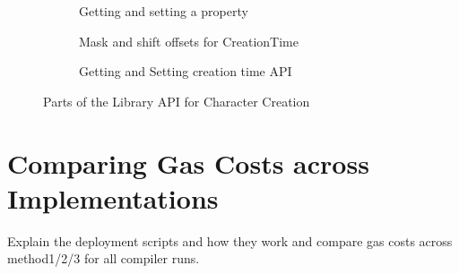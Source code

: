 \begin{figure}[H]
  \begin{subfigure}[b]{\textwidth}
    \centering
    
    \caption{Getting and setting a property}
  \end{subfigure}
  \begin{subfigure}[b]{\textwidth}
    \centering
    
    \caption{Mask and shift offsets for CreationTime}
  \end{subfigure}
  \begin{subfigure}[b]{\textwidth}
    \centering
    
    \caption{Getting and Setting creation time API}
  \end{subfigure}
  \caption{Parts of the Library API for Character Creation}
  \label{apx:scalability:lib}
\end{figure}

\section{Comparing Gas Costs across Implementations}

Explain the deployment scripts and how they work and compare gas costs across method1/2/3 for all compiler runs.


%     

%     

%     

